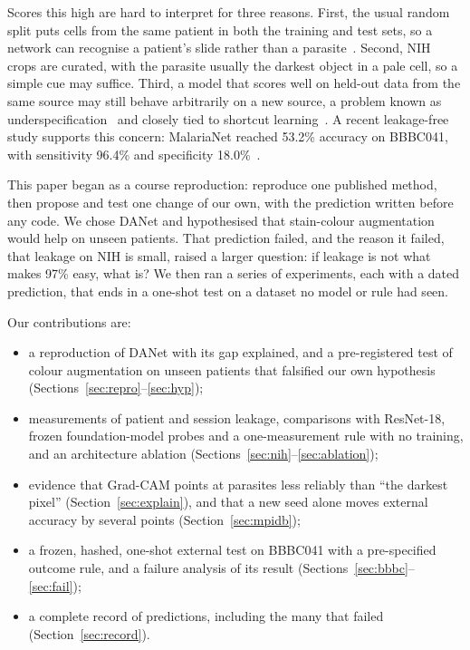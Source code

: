 \documentclass[conference]{IEEEtran}
\begin{document}
Scores this high are hard to interpret for three reasons. First, the usual random split puts cells from the same patient in both the training and test sets, so a network can recognise a patient's slide rather than a parasite~\cite{kapoor2023,varoquaux2022}. Second, NIH crops are curated, with the parasite usually the darkest object in a pale cell, so a simple cue may suffice. Third, a model that scores well on held-out data from the same source may still behave arbitrarily on a new source, a problem known as underspecification~\cite{damour2022} and closely tied to shortcut learning~\cite{geirhos2020,zech2018}. A recent leakage-free study supports this concern: MalariaNet reached 53.2\% accuracy on BBBC041, with sensitivity 96.4\% and specificity 18.0\%~\cite{hou2026malarianet}.

This paper began as a course reproduction: reproduce one published method, then propose and test one change of our own, with the prediction written before any code. We chose DANet and hypothesised that stain-colour augmentation would help on unseen patients. That prediction failed, and the reason it failed, that leakage on NIH is small, raised a larger question: if leakage is not what makes 97\% easy, what is? We then ran a series of experiments, each with a dated prediction, that ends in a one-shot test on a dataset no model or rule had seen.

Our contributions are:
\begin{itemize}
\item a reproduction of DANet with its gap explained, and a pre-registered test of colour augmentation on unseen patients that falsified our own hypothesis (Sections~\ref{sec:repro}--\ref{sec:hyp});
\item measurements of patient and session leakage, comparisons with ResNet-18, frozen foundation-model probes and a one-measurement rule with no training, and an architecture ablation (Sections~\ref{sec:nih}--\ref{sec:ablation});
\item evidence that Grad-CAM points at parasites less reliably than ``the darkest pixel'' (Section~\ref{sec:explain}), and that a new seed alone moves external accuracy by several points (Section~\ref{sec:mpidb});
\item a frozen, hashed, one-shot external test on BBBC041 with a pre-specified outcome rule, and a failure analysis of its result (Sections~\ref{sec:bbbc}--\ref{sec:fail});
\item a complete record of predictions, including the many that failed (Section~\ref{sec:record}).
\end{itemize}
\end{document}
